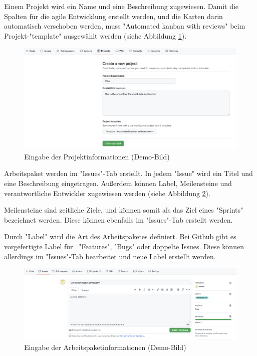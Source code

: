 Einem Projekt wird ein Name und eine Beschreibung zugewiesen. Damit die Spalten für die agile Entwicklung erstellt werden, und die Karten darin automatisch verschoben werden, muss  "Automated kanban with reviews" beim Projekt-"template" ausgewählt werden (siehe Abbildung \ref{fig:enterProjectInfo}).

\begin{figure}[H]
    \centering
    \includegraphics[width=\textwidth]{media/ProjectManagement/EnterProjectInfo.png}
    \caption{Eingabe der Projektinformationen (Demo-Bild)}
    \label{fig:enterProjectInfo}
\end{figure}


Arbeitspaket werden im "Issues"-Tab erstellt. In jedem "Issue" wird ein Titel und eine Beschreibung eingetragen. Außerdem können Label, Meilensteine und verantwortliche Entwickler zugewiesen werden (siehe Abbildung \ref{fig:createIssue}). 

Meilensteine sind zeitliche Ziele, und können somit als das Ziel eines "Sprints" bezeichnet werden. Diese können ebenfalls im "Issues"-Tab erstellt werden.

Durch "Label" wird die Art des Arbeitspaketes definiert. Bei Github gibt es vorgefertigte Label für \zb\ "Features", "Bugs" oder doppelte Issues. Diese können allerdings im "Issues"-Tab bearbeitet und neue Label erstellt werden.

\begin{figure}[H]
    \centering
    \includegraphics[width=\textwidth]{media/ProjectManagement/CreateIssue.png}
    \caption{Eingabe der Arbeitspaketinformationen (Demo-Bild)}
    \label{fig:createIssue}
\end{figure}

